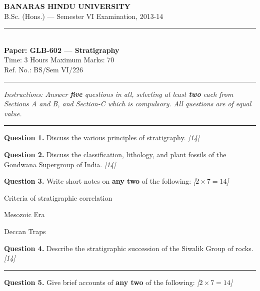 \documentclass[11pt,a4paper]{article}
\newcommand{\pts}[1]{\hfill   \textit{[#1]}}
\begin{document}
\begin{center}
  {\large\bfseries BANARAS HINDU UNIVERSITY}\\[2pt]
  {\normalsize B.Sc. (Hons.) --- Semester VI Examination, 2013-14}\\[6pt]
  \rule{0.8\linewidth}{0.5pt}\\[6pt]
  {\large\bfseries Paper: GLB-602 --- Stratigraphy}\\[4pt]
  {\normalsize Time: 3 Hours \hfill Maximum Marks: 70}\\[2pt]
  {\small Ref. No.: BS/Sem VI/226}
\end{center}
\rule{\linewidth}{0.4pt}
\smallskip



\noindent   \textit{Instructions: Answer   \textbf{five} questions in all, selecting at least   \textbf{two} each from Sections A and B, and Section-C which is compulsory. All questions are of equal value.}
\bigskip

\bigskip


\rule{\linewidth}{0.4pt}\smallskip




\noindent   \textbf{Question 1.} Discuss the various principles of stratigraphy. \pts{14}

\medskip


\noindent   \textbf{Question 2.} Discuss the classification, lithology, and plant fossils of the Gondwana Supergroup of India. \pts{14}

\medskip


\noindent   \textbf{Question 3.} Write short notes on   \textbf{any two} of the following: \pts{$2  \times 7 = 14$}

\begin{parts}
  \item Criteria of stratigraphic correlation
  \item Mesozoic Era
  \item Deccan Traps
\end{parts}

\medskip


\noindent   \textbf{Question 4.} Describe the stratigraphic succession of the Siwalik Group of rocks. \pts{14}

\bigskip


\rule{\linewidth}{0.4pt}\smallskip




\noindent   \textbf{Question 5.} Give brief accounts of   \textbf{any two} of the following: \pts{$2  \times 7 = 14$}
\end{document}
